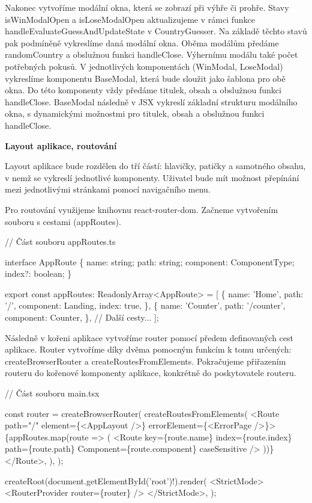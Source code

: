 Nakonec vytvoříme modální okna, která se zobrazí při výhře či prohře. Stavy isWinModalOpen a isLoseModalOpen aktualizujeme v rámci funkce handleEvaluateGuessAndUpdateState v CountryGuesser. 
Na základě těchto stavů pak podmíněně vykreslíme daná modální okna. Oběma modálům předáme randomCountry a obslužnou funkci handleClose. Výhernímu modálu také počet potřebných pokusů. 
V jednotlivých komponentách (WinModal, LoseModal) vykreslíme komponentu BaseModal, která bude sloužit jako šablona pro obě okna. Do této komponenty vždy předáme titulek, obsah a obslužnou funkci handleClose. 
BaseModal následně v JSX vykreslí základní strukturu modálního okna, s dynamickými možnostmi pro titulek, obsah a obslužnou funkci handleClose.

\begin{flushleft}
  \textbf{Layout aplikace, routování}
\end{flushleft}

Layout aplikace bude rozdělen do tří částí: hlavičky, patičky a samotného obsahu, v nemž se vykreslí jednotlivé komponenty. Uživatel bude mít možnost přepínání mezi jednotlivými stránkami pomocí navigačního menu.

Pro routování využijeme knihovnu react-router-dom. Začneme vytvořením souboru s cestami (appRoutes).

\begin{prog}
// Část souboru appRoutes.ts

interface AppRoute \{
  name: string;
  path: string;
  component: ComponentType;
  index?: boolean;
\}

export const appRoutes: ReadonlyArray<AppRoute> = [
  \{
    name: 'Home',
    path: '/',
    component: Landing,
    index: true,
  \},
  \{
    name: 'Counter',
    path: '/counter',
    component: Counter,
  \},
  // Další cesty...
];
\end{prog}

Následně v kořeni aplikace vytvoříme router pomocí předem definovaných cest aplikace. 
Router vytvoříme díky dvěma pomocným funkcím k tomu určených: createBrowserRouter a createRoutesFromElements. Pokračujeme přiřazením routeru do kořenové komponenty aplikace, konkrétně do poskytovatele routeru.

\begin{prog}
// Část souboru main.tsx

const router = createBrowserRouter(
  createRoutesFromElements(
    <Route path="/" element=\{<AppLayout />\} errorElement=\{<ErrorPage />\}>
      \{appRoutes.map(route => (
        <Route
          key=\{route.name\}
          index=\{route.index\}
          path=\{route.path\}
          Component=\{route.component\}
          caseSensitive
        />
      ))\}
    </Route>,
  ),
);

createRoot(document.getElementById('root')!).render(
  <StrictMode>
    <RouterProvider router=\{router\} />
  </StrictMode>,
);
\end{prog}

